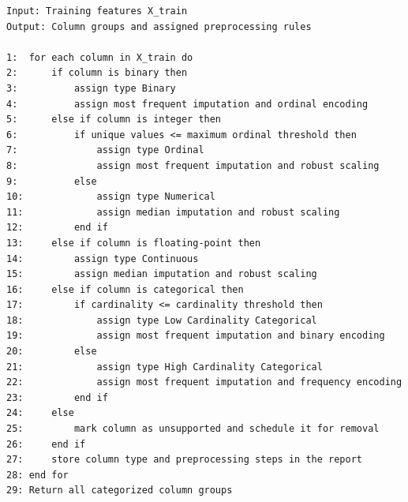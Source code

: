 \begin{lstlisting}[style=algostyle,caption={Column Type Detection and Preprocessing Assignment}]
Input: Training features X_train
Output: Column groups and assigned preprocessing rules

1:  for each column in X_train do
2:      if column is binary then
3:          assign type Binary
4:          assign most frequent imputation and ordinal encoding
5:      else if column is integer then
6:          if unique values <= maximum ordinal threshold then
7:              assign type Ordinal
8:              assign most frequent imputation and robust scaling
9:          else
10:             assign type Numerical
11:             assign median imputation and robust scaling
12:         end if
13:     else if column is floating-point then
14:         assign type Continuous
15:         assign median imputation and robust scaling
16:     else if column is categorical then
17:         if cardinality <= cardinality threshold then
18:             assign type Low Cardinality Categorical
19:             assign most frequent imputation and binary encoding
20:         else
21:             assign type High Cardinality Categorical
22:             assign most frequent imputation and frequency encoding
23:         end if
24:     else
25:         mark column as unsupported and schedule it for removal
26:     end if
27:     store column type and preprocessing steps in the report
28: end for
29: Return all categorized column groups
\end{lstlisting}

